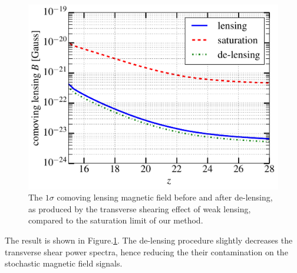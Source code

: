 \begin{figure}[h]
\centering
\includegraphics[scale=0.4]{delensingB.pdf}
\caption{The $1\sigma$ comoving lensing magnetic field before and after de-lensing, as produced by the transverse shearing effect of weak lensing, compared to the saturation limit of our method.}
\label{fig:ps_B}
\end{figure}

The result is shown in Figure.\ref{fig:ps_B}. The de-lensing procedure slightly decreases the transverse shear power spectra, hence reducing the their contamination on the stochastic magnetic field signals.

